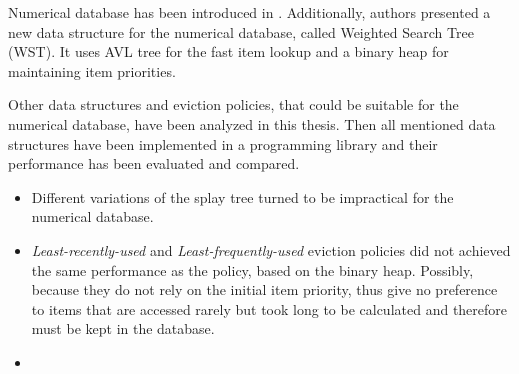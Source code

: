 Numerical database has been introduced in \cite{park90}. Additionally, authors presented a new data structure for the numerical database, called Weighted Search Tree (WST). It uses AVL tree for the fast item lookup and a binary heap for maintaining item priorities.

Other data structures and eviction policies, that could be suitable for the numerical database, have been analyzed in this thesis. Then all mentioned data structures have been implemented in a programming library and their performance has been evaluated and compared.
\begin{itemize}
\item Different variations of the splay tree\cite{splay_tree} turned to be impractical for the numerical database.
\item \emph{Least-recently-used} and \emph{Least-frequently-used} eviction policies did not achieved the same performance as the policy, based on the binary heap. Possibly, because they do not rely on the initial item priority, thus give no preference to items that are accessed rarely but took long to be calculated and therefore must be kept in the database.
\item
\end{itemize}

